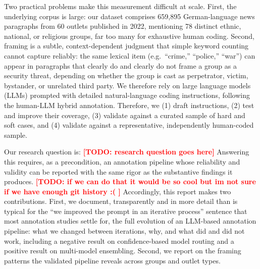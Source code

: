 \documentclass[a4paper,oneside,bibliography=totoc]{scrartcl}
\newcommand{\todo}[1]{\textcolor{red}{\textbf{[TODO: #1]}}}
\begin{document}
Two practical problems make this measurement difficult at scale. First, the underlying corpus is large: our dataset comprises 659{,}895 German-language news paragraphs from 60 outlets published in 2022, mentioning 78 distinct ethnic, national, or religious groups, far too many for exhaustive human coding. Second, framing is a subtle, context-dependent judgment that simple keyword counting cannot capture reliably: the same lexical item (e.g.\ ``crime,'' ``police,'' ``war'') can appear in paragraphs that clearly do and clearly do not frame a group as a security threat, depending on whether the group is cast as perpetrator, victim, bystander, or unrelated third party. We therefore rely on large language models (LLMs) prompted with detailed natural-language coding instructions, following the human-LLM hybrid annotation. Therefore, we (1) draft instructions, (2) test and improve their coverage, (3) validate against a curated sample of hard and soft cases, and (4) validate against a representative, independently human-coded sample.

Our research question is: \todo{research question goes here}  Answering this requires, as a precondition, an annotation pipeline whose reliability and validity can be reported with the same rigor as the substantive findings it produces. \todo{if we can do that it would be so cool but im not sure if we have enough git history :( } Accordingly, this report makes two contributions. First, we document, transparently and in more detail than is typical for the ``we improved the prompt in an iterative process'' sentence that most annotation studies settle for, the full evolution of an LLM-based annotation pipeline: what we changed between iterations, why, and what did and did not work, including a negative result on confidence-based model routing and a positive result on multi-model ensembling. Second, we report on the framing patterns the validated pipeline reveals across groups and outlet types. %
\end{document}

